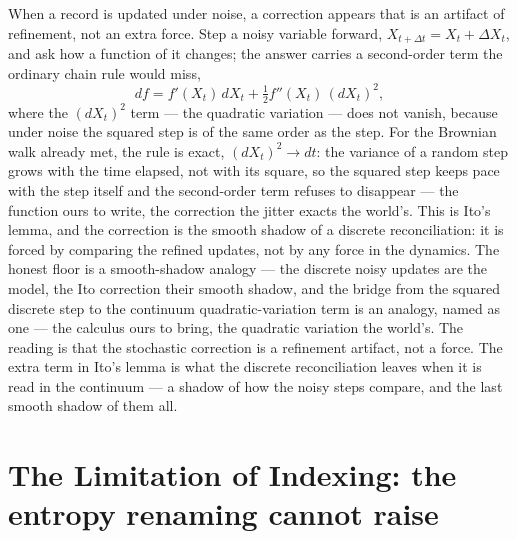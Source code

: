 When a record is updated under noise, a correction appears that is an artifact of refinement, not an extra
force. Step a noisy variable forward, $X_{t+\Delta t} = X_t + \Delta X_t$, and ask how a function of it
changes; the answer carries a second-order term the ordinary chain rule would miss,
\begin{equation}
  df = f'(X_t)\,dX_t + \tfrac{1}{2} f''(X_t)\,(dX_t)^2,
\end{equation}
where the $(dX_t)^2$ term --- the quadratic variation --- does not vanish, because under noise the squared
step is of the same order as the step. For the Brownian walk already met, the rule is exact, $(dX_t)^2
\to dt$: the variance of a random step grows with the time elapsed, not with its square, so the squared step
keeps pace with the step itself and the second-order term refuses to disappear --- the function ours to write,
the correction the jitter exacts the world's. This is Ito's lemma, and the correction is the smooth shadow of a
discrete reconciliation: it is forced by comparing the refined updates, not by any force in the dynamics. The
honest floor is a smooth-shadow analogy --- the discrete noisy updates are the model, the Ito correction their
smooth shadow, and the bridge from the squared discrete step to the continuum quadratic-variation term is an
analogy, named as one --- the calculus ours to bring, the quadratic variation the world's. The reading is that
the stochastic correction is a refinement artifact, not a force.
The extra term in Ito's lemma is what the discrete reconciliation leaves when it is read in the continuum ---
a shadow of how the noisy steps compare, and the last smooth shadow of them all.

\section{The Limitation of Indexing: the entropy renaming cannot raise}
\label{se:limitation-indexing}

